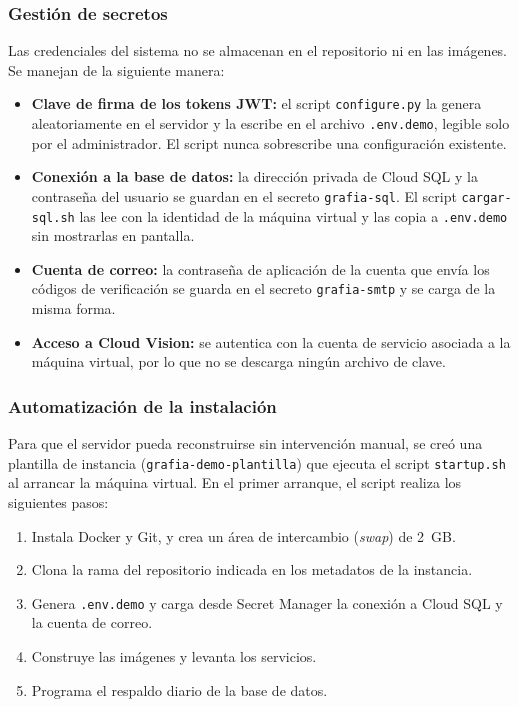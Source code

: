 \subsubsection{Gestión de secretos}

Las credenciales del sistema no se almacenan en el repositorio ni en las imágenes. Se manejan de la siguiente manera:

\begin{itemize}
    \item \textbf{Clave de firma de los tokens JWT:} el script \texttt{configure.py} la genera aleatoriamente en el servidor y la escribe en el archivo \texttt{.env.demo}, legible solo por el administrador. El script nunca sobrescribe una configuración existente.
    \item \textbf{Conexión a la base de datos:} la dirección privada de Cloud SQL y la contraseña del usuario se guardan en el secreto \texttt{grafia-sql}. El script \texttt{cargar-sql.sh} las lee con la identidad de la máquina virtual y las copia a \texttt{.env.demo} sin mostrarlas en pantalla.
    \item \textbf{Cuenta de correo:} la contraseña de aplicación de la cuenta que envía los códigos de verificación se guarda en el secreto \texttt{grafia-smtp} y se carga de la misma forma.
    \item \textbf{Acceso a Cloud Vision:} se autentica con la cuenta de servicio asociada a la máquina virtual, por lo que no se descarga ningún archivo de clave.
\end{itemize}

\subsubsection{Automatización de la instalación}

Para que el servidor pueda reconstruirse sin intervención manual, se creó una plantilla de instancia (\texttt{grafia-demo-plantilla}) que ejecuta el script \texttt{startup.sh} al arrancar la máquina virtual. En el primer arranque, el script realiza los siguientes pasos:

\begin{enumerate}
    \item Instala Docker y Git, y crea un área de intercambio (\textit{swap}) de 2~GB.
    \item Clona la rama del repositorio indicada en los metadatos de la instancia.
    \item Genera \texttt{.env.demo} y carga desde Secret Manager la conexión a Cloud SQL y la cuenta de correo.
    \item Construye las imágenes y levanta los servicios.
    \item Programa el respaldo diario de la base de datos.
\end{enumerate}

